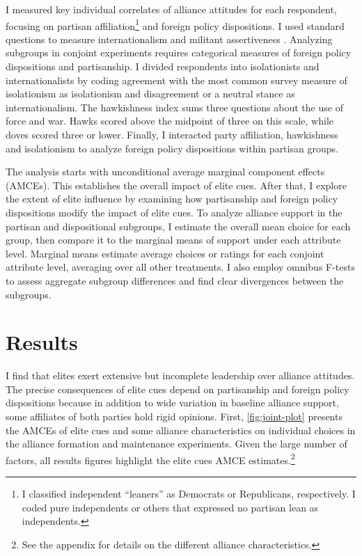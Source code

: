 \documentclass[12pt]{article}
\begin{document}
I measured key individual correlates of alliance attitudes for each respondent, focusing on partisan affiliation\footnote{I classified independent ``leaners'' as Democrats or Republicans, respectively. I coded pure independents or others that expressed no partisan lean as independents.} and foreign policy dispositions. 
I used standard questions to measure internationalism and militant assertiveness \citep{KertzerBrutger2016}.
Analyzing subgroups in conjoint experiments requires categorical measures of foreign policy dispositions and partisanship. 
I divided respondents into isolationists and internationalists by coding agreement with the most common survey measure of isolationism as isolationism and disagreement or a neutral stance as internationalism. 
The hawkishness index sums three questions about the use of force and war. 
Hawks scored above the midpoint of three on this scale, while doves scored three or lower. 
Finally, I interacted party affiliation, hawkishness and isolationism to analyze foreign policy dispositions within partisan groups.


The analysis starts with unconditional average marginal component effects (AMCEs).
This establishes the overall impact of elite cues. 
After that, I explore the extent of elite influence by examining how partisanship and foreign policy dispositions modify the impact of elite cues. 
To analyze alliance support in the partisan and dispositional subgroups, I estimate the overall mean choice for each group, then compare it to the marginal means of support under each attribute level.
Marginal means estimate average choices or ratings for each conjoint attribute level, averaging over all other treatments. 
I also employ omnibus F-tests to assess aggregate subgroup differences \citep{Leeperetal2020} and find clear divergences between the subgroups.  


\section{Results} 


I find that elites exert extensive but incomplete leadership over alliance attitudes.
The precise consequences of elite cues depend on partisanship and foreign policy dispositions because in addition to wide variation in baseline alliance support, some affiliates of both parties hold rigid opinions. 
First, \autoref{fig:joint-plot} presents the AMCEs of elite cues and some alliance characteristics on individual choices in the alliance formation and maintenance experiments.
Given the large number of factors, all results figures highlight the elite cues AMCE estimates.\footnote{See the appendix for details on the different alliance characteristics.}
\end{document}
